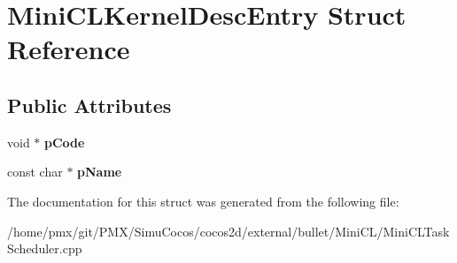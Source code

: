 \hypertarget{structMiniCLKernelDescEntry}{}\section{Mini\+C\+L\+Kernel\+Desc\+Entry Struct Reference}
\label{structMiniCLKernelDescEntry}
\subsection*{Public Attributes}
\begin{DoxyCompactItemize}
\item 
\mbox{\label{structMiniCLKernelDescEntry_af781b97e5a99cdd1e46ec2af45b84e8d}} 
void $\ast$ {\bfseries p\+Code}
\item 
\mbox{\label{structMiniCLKernelDescEntry_ac02eb5ee072b9d0467a5eac66b5e468e}} 
const char $\ast$ {\bfseries p\+Name}
\end{DoxyCompactItemize}


The documentation for this struct was generated from the following file\+:\begin{DoxyCompactItemize}
\item 
/home/pmx/git/\+P\+M\+X/\+Simu\+Cocos/cocos2d/external/bullet/\+Mini\+C\+L/Mini\+C\+L\+Task\+Scheduler.\+cpp\end{DoxyCompactItemize}
